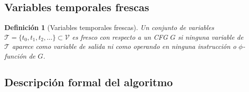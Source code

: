 \documentclass[12pt, a4paper]{article}
\newtheorem{definition}{Definición}[section]
\begin{document}
\subsection{Variables temporales frescas}

\begin{definition}[Variables temporales frescas]
\label{def:frescas}
Un conjunto de variables $\mathcal{T} = \{t_0, t_1, t_2, \ldots\} \subset \mathcal{V}$ es
\emph{fresco} con respecto a un CFG $G$ si ninguna variable de $\mathcal{T}$ aparece como
variable de salida ni como operando en ninguna instrucción o $\phi$-función de $G$.
\end{definition}

\subsection{Descripción formal del algoritmo}
\end{document}
